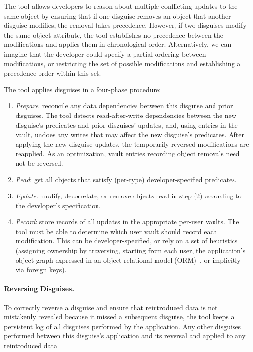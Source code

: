 The tool allows developers to reason about multiple conflicting updates to the same object by ensuring that 
if one disguise removes an object that another disguise modifies, the removal takes
precedence.
%
However, if two disguises modify the same object attribute, the tool
establishes no precedence between the modifications and applies them in chronological order.
Alternatively, we can imagine that the developer could specify a partial ordering between
modifications, or restricting the set of possible modifications and establishing a precedence order
within this set.

The tool applies disguises in a four-phase procedure:
\begin{enumerate}
    \item \emph{Prepare}: reconcile any data dependencies between this disguise and prior disguises.
            The tool detects read-after-write dependencies between the new disguise's predicates and prior disguises'
            updates, and, using entries in the vault, undoes any writes that may affect the new disguise's predicates. After
            applying the new disguise updates, the temporarily reversed modifications are reapplied. As an
            optimization, vault entries recording object removals need not be reversed.
        \item \emph{Read}: get all objects that satisfy (per-type) developer-specified predicates.
        \item \emph{Update}: modify, decorrelate, or remove objects read in step (2) according to the
        developer's specification.
    \item \emph{Record}: store records of all updates in the appropriate per-user vaults. The tool
        must be able to determine which user vault should record each modification. This can be
        developer-specified, or rely on a set of heuristics (\eg assigning ownership by traversing,
        starting from each user, the application's object graph expressed in an object-relational
        model (ORM)~\cite{orm}, or implicitly via foreign keys). 

\end{enumerate}

\paragraph{Reversing Disguises.}
To correctly reverse a disguise and ensure that reintroduced data is not mistakenly revealed because
it missed a subsequent disguise, the tool keeps a persistent log of all disguises performed by the 
application. Any other disguises performed between this disguise's application and its reversal and
applied to any reintroduced data.
